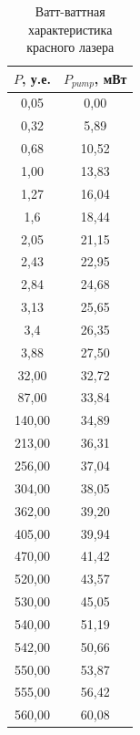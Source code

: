 \documentclass[a4paper,12pt]{report}
\begin{document}
\begin{table}[H]
\begin{tabular}{|c|c|}
\hline
$P$, у.е. & $P_{pump}$, мВт \\ \hline
0,05        & 0,00          \\ \hline
0,32        & 5,89       \\ \hline
0,68        & 10,52    \\ \hline
1,00           & 13,83    \\ \hline
1,27        & 16,04     \\ \hline
1,6         & 18,44     \\ \hline
2,05        & 21,15    \\ \hline
2,43        & 22,95     \\ \hline
2,84        & 24,68    \\ \hline
3,13        & 25,65    \\ \hline
3,4         & 26,35    \\ \hline
3,88        & 27,50     \\ \hline
32,00          & 32,72    \\ \hline
87,00          & 33,84    \\ \hline
140,00         & 34,89     \\ \hline
213,00         & 36,31    \\ \hline
256,00         & 37,04    \\ \hline
304,00         & 38,05    \\ \hline
362,00         & 39,20    \\ \hline
405,00         & 39,94    \\ \hline
470,00         & 41,42    \\ \hline
520,00         & 43,57    \\ \hline
530,00         & 45,05    \\ \hline
540,00         & 51,19     \\ \hline
542,00         & 50,66    \\ \hline
550,00         & 53,87     \\ \hline
555,00         & 56,42    \\ \hline
560,00         & 60,08     \\ \hline
\end{tabular}
\caption{Ватт-ваттная характеристика красного лазера}
\label{tab.5}
\end{table}
\end{document}
